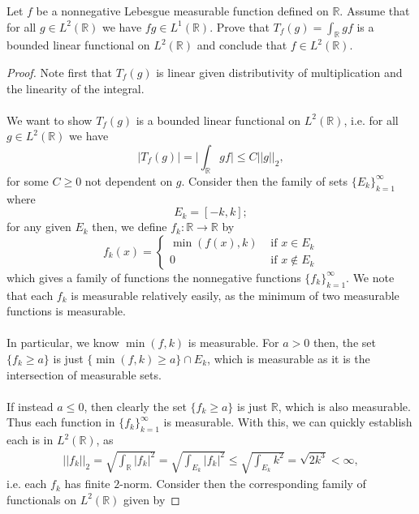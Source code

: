\documentclass[12pt]{article}
\newenvironment{ex}[2][Exercise]{\begin{trivlist}
\item[\hskip \labelsep {\bfseries #1}\hskip \labelsep {\bfseries #2.}]}{\end{trivlist}}
\begin{document}
\begin{ex}{17}
    Let $f$ be a nonnegative Lebesgue measurable function defined on $\mathbb{R}$. Assume that for all $g \in L^2(\mathbb{R})$ we have $fg \in L^1(\mathbb{R})$. Prove that $T_f(g) = \int_\mathbb{R} gf$ is a bounded linear functional on $L^2(\mathbb{R})$ and conclude that $f \in L^2(\mathbb{R})$. 
    \begin{proof}
        Note first that $T_f(g)$ is linear given distributivity of multiplication and the linearity of the integral.
        \\ \\
        We want to show $T_f(g)$ is a bounded linear functional on $L^2(\mathbb{R})$, i.e. for all $g \in L^2(\mathbb{R})$ we have 
        $$|T_f(g)| = \Big | \int_\mathbb{R} gf \Big | \leq C||g||_2,$$
        for some $C \geq 0$ not dependent on $g$. Consider then the family of sets $\{E_k\}_{k = 1}^\infty$ where 
        $$E_k = [-k,k];$$
        for any given $E_k$ then, we define $f_k : \mathbb{R} \rightarrow \mathbb{R}$ by 
        \begin{equation}
            f_k(x) = \begin{cases}
                \min(f(x), k) & \text{ if } x \in E_k \\
                0 & \text{ if } x \notin E_k 
            \end{cases}
        \end{equation}
        which gives a family of functions the nonnegative functions $\{f_k\}_{k = 1}^\infty$. We note that each $f_k$ is measurable relatively easily, as the minimum of two measurable functions is measurable. \\ \\
        In particular, we know $\min(f, k)$ is measurable. For $a > 0$ then, the set $\{f_k \geq a\}$ is just $\{\min(f,k) \geq a\} \cap E_k$, which is measurable as it is the intersection of measurable sets. \\ \\
        If instead $a \leq 0$, then clearly the set $\{f_k \geq a\}$ is just $\mathbb{R}$, which is also measurable. Thus each function in $\{f_k\}_{k = 1}^\infty$ is measurable. With this, we can quickly establish each is in $L^2(\mathbb{R})$, as 
        \begin{align*}
            ||f_k||_2 = \sqrt{\int_\mathbb{R} |f_k|^2} = \sqrt{\int_{E_k} |f_k|^2} \leq \sqrt{\int_{E_k} k^2} = \sqrt{2k^3} < \infty,
        \end{align*}
        i.e. each $f_k$ has finite $2$-norm. Consider then the corresponding family of functionals on $L^2(\mathbb{R})$ given by 

\end{proof}
\end{ex}
\end{document}
